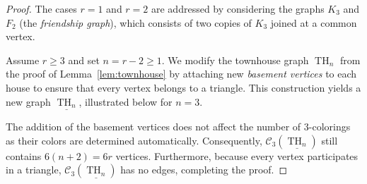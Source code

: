 \documentclass{amsart}
\theoremstyle{hypothesisstyle}
\theoremstyle{definition}
\theoremstyle{remark}
\numberwithin{equation}{section}
\begin{document}
\begin{proof} The cases $r = 1$ and $r = 2$ are addressed by considering the graphs $K_3$ and $F_2$ (the \emph{friendship graph}), which consists of two copies of $K_3$ joined at a common vertex. 

Assume $r\geq 3$ and set $n=r-2\geq 1$. We modify the townhouse graph $\operatorname{TH}_n$ from the proof of Lemma~\ref{lem:townhouse} by attaching new \emph{basement vertices} to each house to ensure that every vertex belongs to a triangle. This construction yields a new graph $\underline{\operatorname{TH}_{n}}$, illustrated below for $n = 3$. 

\begin{center}
    
\end{center}

The addition of the basement vertices does not affect the number of $3$-colorings as their colors are determined automatically. Consequently, $\mathcal{C}_3(\underline{\operatorname{TH}_n})$ still contains $6(n+2)=6r$ vertices. Furthermore, because every vertex participates in a triangle, $\mathcal{C}_3(\underline{\operatorname{TH}_n})$ has no edges, completing the proof. \end{proof}
\end{document}

